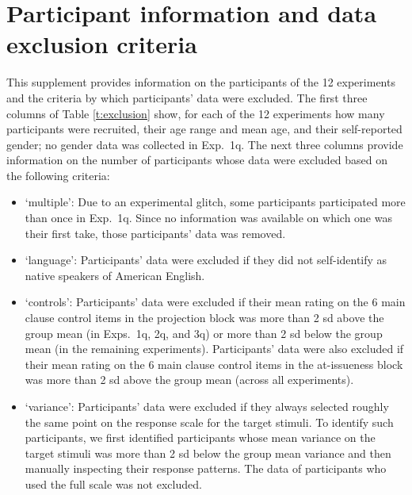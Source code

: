 \documentclass[11pt,fleqn]{article}
\newcommand{\6}{\mbox{$[\hspace*{-.6mm}[$}}
\newcommand{\9}{\mbox{$]\hspace*{-.6mm}]$}}
\begin{document}
\section{Participant information and data exclusion criteria}\label{a-participants}

  This supplement provides information on the participants of the 12 experiments and the criteria by which participants' data were excluded. The first three columns of Table \ref{t:exclusion} show, for each of the 12 experiments how many participants were recruited, their age range and mean age, and their self-reported gender; no gender data was collected in Exp.~1q. The next three columns provide information on the number of participants whose data were excluded based on the following criteria:

  \begin{itemize}[itemsep=-2pt]

  \item `multiple': Due to an experimental glitch, some participants participated more than once in Exp.~1q. Since no information was available on which one was their first take, those participants' data was removed. 

  \item `language': Participants' data were excluded if they did not self-identify as native speakers of American English.

  \item `controls': Participants' data were excluded if their mean rating on the 6 main clause control items in the projection block was more than 2 sd above the group mean (in Exps.~1q, 2q, and 3q) or more than 2 sd below the group mean (in the remaining experiments). Participants' data were also excluded if their mean rating on the 6 main clause control items in the at-issueness block was more than 2 sd above the group mean (across all experiments).
   
  \item `variance': Participants' data were excluded if they always selected roughly the same point on the response scale for the target stimuli. To identify such participants, we first identified participants whose mean variance on the target stimuli was more than 2 sd below the group mean variance and then manually inspecting their response patterns. The data of participants who used the full scale was not excluded.  
  \end{itemize}
\end{document}
